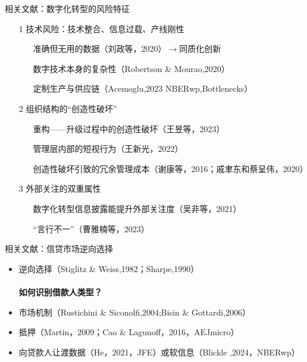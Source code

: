 \documentclass{beamer}
\begin{document}
\begin{frame}{相关文献：数字化转型的风险特征}
	\begin{itemize}
		\item[1] 技术风险：技术整合、信息过载、产线刚性\\
		\begin{itemize}
			\item[] 准确但无用的数据（刘政等，2020）$\rightarrow$同质化创新\\
			\item[] 数字技术本身的复杂性（Robertson \& Mourao,2020）\\
			\item[] 定制生产与供应链（Acemoglu,2023 NBERwp,Bottlenecks）
		\end{itemize}
		\item[2] 组织结构的“创造性破坏”\\
		\begin{itemize}
			\item[] 重构——升级过程中的创造性破坏（王昱等，2023）\\
			\item[] 管理层内部的短视行为（王新光，2022）\\
			\item[]  创造性破坏引致的冗余管理成本（谢康等，2016；戚聿东和蔡呈伟，2020）
		\end{itemize}
		\item[3] 外部关注的双重属性
		\begin{itemize}
			\item[] 数字化转型信息披露能提升外部关注度（吴非等，2021）
			\item[] “言行不一”（曹雅楠等，2023）
		\end{itemize}
	\end{itemize}
\end{frame}

\begin{frame}{相关文献：信贷市场逆向选择}
	\begin{itemize}
		\item 逆向选择（Stiglitz \& Weiss,1982；Sharpe,1990）\\~\\
		\textbf{如何识别借款人类型？}	
		\item 市场机制（Rustichini \& Siconolfi,2004;Bisin \& Gottardi,2006）
		\item 抵押（Martin，2009；Cao \& Lagunoff，2016，AEJmicro）\\
		\item 向贷款人让渡数据（He，2021，JFE）或软信息（Blickle ,2024，NBERwp） 
	\end{itemize}
\end{frame}
\end{document}
